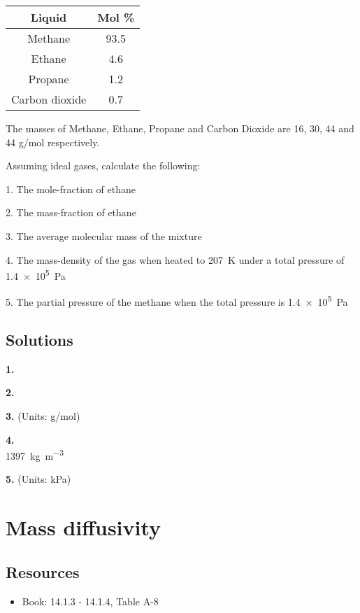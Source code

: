 \begin{tabular}[c]{|c|c|}
    \hline
    \textbf{Liquid} & \textbf{Mol \%}\\
    \hline
    Methane         & 93.5  \\
    Ethane          & 4.6   \\
    Propane         & 1.2   \\
    Carbon dioxide  & 0.7   \\
    \hline
\end{tabular}

The masses of Methane, Ethane, Propane and Carbon Dioxide are 16, 30, 44 and 44 g/mol respectively.

Assuming ideal gases, calculate the following:

1. The mole-fraction of ethane

2. The mass-fraction of ethane

3. The average molecular mass of the mixture

4. The mass-density of the gas when heated to \SI{207}{\kelvin} under a total pressure of \SI{1.4e5}{\pascal}

5. The partial pressure of the methane when the total pressure is \SI{1.4e5}{\pascal}

\subsection*{Solutions}

\textbf{1.}\\

\textbf{2.}\\

\textbf{3.} (Units: g/mol)\\

\textbf{4.}\\
\SI{1397}{\kg\per\cubic\meter}

\textbf{5.} (Units: kPa)\\




\newpage
\section{Mass diffusivity}

\subsection*{Resources}
\begin{itemize}
    \item Book: 14.1.3 - 14.1.4, Table A-8
\end{itemize}

